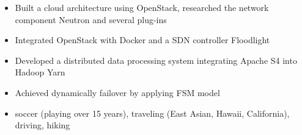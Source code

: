 \documentclass[letterpaper,10pt]{resume}
\begin{document}
	\begin{body}
		\begin{itemize}
		\item Built a cloud architecture using OpenStack, researched the network component Neutron and several plug-ins
		\item Integrated OpenStack with Docker and a SDN controller Floodlight
		\end{itemize}
		

		\begin{itemize}
		\item Developed a distributed data processing system integrating Apache S4 into Hadoop Yarn
		\item Achieved dynamically failover by applying FSM model
		\end{itemize}
	\end{body}
\vspace*{-1pt}

	\begin{body}
	\begin{itemize}
	\item soccer (playing over 15 years), traveling (East Asian, Hawaii, California), driving, hiking
	\end{itemize}
	\end{body}

	
\end{document}
